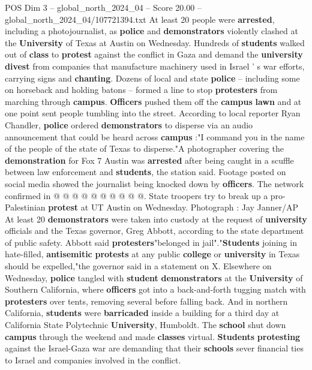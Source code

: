 \begin{textsample}{POS Dim 3 – global\_north\_2024\_04 – Score 20.00 – global\_north\_2024\_04/107721394.txt}  \label{ex:f3_pos_060}
At least 20 people were \textbf{arrested}, including a photojournalist, as \textbf{police} and \textbf{demonstrators} violently clashed at the \textbf{University} of Texas at Austin on Wednesday.
Hundreds of \textbf{students} walked out of \textbf{class} to \textbf{protest} against the conflict in Gaza and demand the \textbf{university} \textbf{divest} from companies that manufacture machinery used in Israel ' s war efforts, carrying signs and \textbf{chanting}.
Dozens of local and state \textbf{police} -- including some on horseback and holding batons -- formed a line to stop \textbf{protesters} from marching through \textbf{campus}. \textbf{Officers} pushed them off the \textbf{campus} \textbf{lawn} and at one point sent people tumbling into the street.
According to local reporter Ryan Chandler, \textbf{police} ordered \textbf{demonstrators} to disperse via an audio announcement that could be heard across \textbf{campus} :"I command you in the name of the people of the state of Texas to disperse."A photographer covering the \textbf{demonstration} for Fox 7 Austin was \textbf{arrested} after being caught in a scuffle between law enforcement and \textbf{students}, the station said.
Footage posted on social media showed the journalist being knocked down by \textbf{officers}.
The network confirmed in @ @ @ @ @ @ @ @ @ @.
State troopers try to break up a pro-Palestinian \textbf{protest} at UT Austin on Wednesday.
Photograph : Jay Janner/AP At least 20 \textbf{demonstrators} were taken into custody at the request of \textbf{university} officials and the Texas governor, Greg Abbott, according to the state department of public safety.
Abbott said \textbf{protesters}"belonged in jail"."\textbf{Students} joining in hate-filled, \textbf{antisemitic} \textbf{protests} at any public \textbf{college} or \textbf{university} in Texas should be expelled,"the governor said in a statement on X.
Elsewhere on Wednesday, \textbf{police} tangled with \textbf{student} \textbf{demonstrators} at the \textbf{University} of Southern California, where \textbf{officers} got into a back-and-forth tugging match with \textbf{protesters} over tents, removing several before falling back.
And in northern California, \textbf{students} were \textbf{barricaded} inside a building for a third day at California State Polytechnic \textbf{University}, Humboldt.
The \textbf{school} shut down \textbf{campus} through the weekend and made \textbf{classes} virtual. \textbf{Students} \textbf{protesting} against the Israel-Gaza war are demanding that their \textbf{schools} sever financial ties to Israel and companies involved in the conflict.

\end{textsample}
